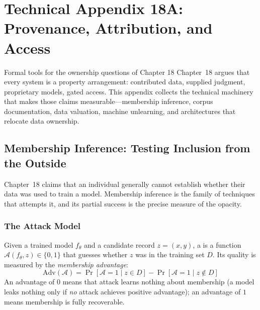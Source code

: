 
\chapter*{Technical Appendix 18A: Provenance, Attribution, and Access}

\begin{chapterquote}{Formal tools for the ownership questions of Chapter 18}
Chapter~18 argues that every \hitl system is a property arrangement: contributed data, supplied judgment, proprietary models, gated access. This appendix collects the technical machinery that makes those claims measurable---membership inference, corpus documentation, data valuation, machine unlearning, and architectures that relocate data ownership.
\end{chapterquote}

\apxnumon
\section{Membership Inference: Testing Inclusion from the Outside}
\label{sec:a18-membership}

Chapter~18 claims that an individual generally cannot establish whether their data was used to train a model. Membership inference is the family of techniques that attempts it, and its partial success is the precise measure of the opacity.

\subsection{The Attack Model}

Given a trained model $f_\theta$ and a candidate record $z = (x, y)$, a  is a function $\mathcal{A}(f_\theta, z) \in \{0, 1\}$ that guesses whether $z$ was in the training set $D$. Its quality is measured by the \emph{membership advantage}:
\[
\mathrm{Adv}(\mathcal{A}) = \Pr[\mathcal{A} = 1 \mid z \in D] - \Pr[\mathcal{A} = 1 \mid z \notin D]
\]
An advantage of $0$ means that attack learns nothing about membership (a model leaks nothing only if \emph{no} attack achieves positive advantage); an advantage of $1$ means membership is fully recoverable.


